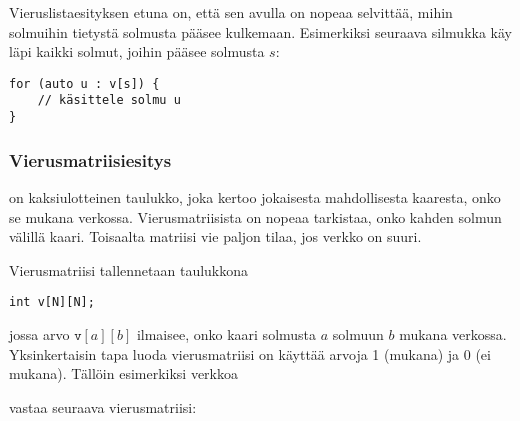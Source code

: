 Vieruslistaesityksen etuna on, että sen avulla on nopeaa selvittää,
mihin solmuihin tietystä solmusta pääsee kulkemaan.
Esimerkiksi seuraava silmukka käy läpi kaikki solmut,
joihin pääsee solmusta $s$:

\begin{lstlisting}
for (auto u : v[s]) {
    // käsittele solmu u
}
\end{lstlisting}

\subsubsection{Vierusmatriisiesitys}


 on kaksiulotteinen taulukko,
joka kertoo jokaisesta mahdollisesta kaaresta,
onko se mukana verkossa.
Vierusmatriisista on nopeaa tarkistaa,
onko kahden solmun välillä kaari.
Toisaalta matriisi vie paljon tilaa,
jos verkko on suuri.

Vierusmatriisi tallennetaan taulukkona

\begin{lstlisting}
int v[N][N];
\end{lstlisting}

jossa arvo $\texttt{v}[a][b]$ ilmaisee,
onko kaari solmusta $a$ solmuun $b$ mukana verkossa.
Yksinkertaisin tapa luoda vierusmatriisi
on käyttää arvoja 1 (mukana) ja 0 (ei mukana).
Tällöin esimerkiksi verkkoa
\begin{center}
\end{center}
vastaa seuraava vierusmatriisi:
\begin{center}
\end{center}

